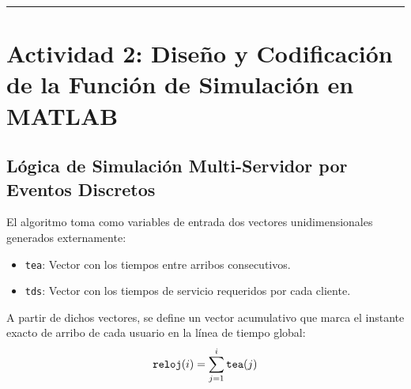 \documentclass[11pt, a4paper]{article}
\begin{document}
\vspace{1em}
\hrule
\vspace{1em}

\section{Actividad 2: Diseño y Codificación de la Función de Simulación en MATLAB}

\subsection{Lógica de Simulación Multi-Servidor por Eventos Discretos}

El algoritmo toma como variables de entrada dos vectores unidimensionales generados externamente:
\begin{itemize}
    \item \texttt{tea}: Vector con los tiempos entre arribos consecutivos.
    \item \texttt{tds}: Vector con los tiempos de servicio requeridos por cada cliente.
\end{itemize}

A partir de dichos vectores, se define un vector acumulativo que marca el instante exacto de arribo de cada usuario en la línea de tiempo global:
\begin{equation}
\text{\texttt{reloj}}(i) = \sum_{j=1}^{i} \text{\texttt{tea}}(j)
\end{equation}
\end{document}
